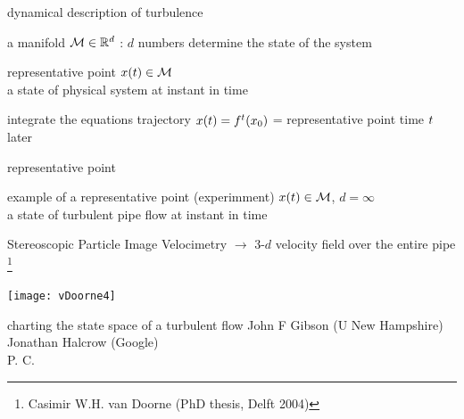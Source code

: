 \begin{frame}{dynamical description of turbulence}

\begin{block}{\statesp}
a manifold $\mathcal{M} \in \mathbb{R}^{d}$ :
$d$ numbers determine the state of the system
\end{block}

\bigskip

\begin{block}{representative point }
$x(t) \in \mathcal{M}$
\\
a state of physical system at instant in time
\end{block}

\bigskip

\begin{block}{integrate the equations}
trajectory $x(t) = {f^{t}({x_0})}$ =
representative point time $t$ later
\end{block}
\end{frame}

\begin{frame}{representative point}
\begin{block}{example of a representative point (experimment)}
$x(t) \in \mathcal{M}$, $d= \infty$ \\
a state of turbulent pipe flow at instant in time
\end{block}

\bigskip

Stereoscopic Particle Image Velocimetry $\to$
3-$d$ velocity field over the entire pipe%
\footnote{\footnotesize
Casimir W.H. van Doorne
(PhD thesis, Delft  2004)
}

\bigskip

\begin{center}
\texttt{[image: vDoorne4]}
\end{center}
\end{frame}

\begin{frame}{charting the state space of a turbulent flow}
John F Gibson (U New Hampshire)
\\
Jonathan Halcrow (Google)
\\
P. C.
\end{frame}

